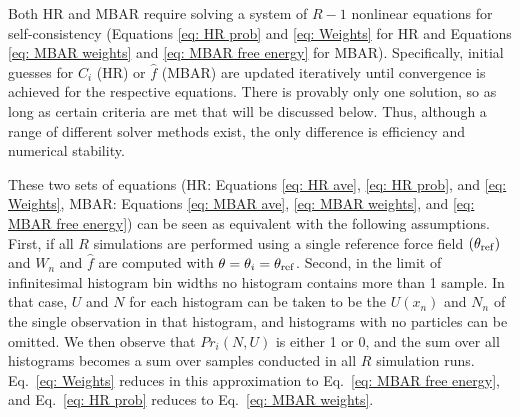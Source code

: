 \documentclass[journal=jced,manuscript=article]{achemso}
\newcommand{\bfv}[1]{{\mbox{\boldmath{$#1$}}}}
\newcommand{\x}{\bfv{x}}
\begin{document}


Both HR and MBAR require solving a system of $R-1$ nonlinear equations for self-consistency (Equations \ref{eq: HR prob} and \ref{eq: Weights} for HR and Equations \ref{eq: MBAR weights} and \ref{eq: MBAR free energy} for MBAR). Specifically, initial guesses for $C_i$ (HR) or $\hat f$ (MBAR) are updated iteratively until convergence is achieved for the respective equations. There is provably only one solution, so as long as certain criteria are met that will be discussed below. Thus, although a range of different solver methods exist, the only difference is efficiency and numerical stability.


These two sets of equations (HR: Equations \ref{eq: HR ave}, \ref{eq: HR prob}, and \ref{eq: Weights}, MBAR: Equations \ref{eq: MBAR ave}, \ref{eq: MBAR weights}, and \ref{eq: MBAR free energy}) can be seen as equivalent with the following assumptions. First, if all $R$ simulations are performed using a single reference force field $(\theta_{\rm ref})$ and $W_{n}$ and $\hat f$ are computed with $\theta = \theta_i = \theta_{\rm ref}$. Second, in the limit of infinitesimal histogram bin widths no histogram contains more than 1 sample. In that case, $U$ and $N$ for each histogram can be taken to be the $U(x_n)$ and $N_n$ of the single observation in that histogram, and histograms with no particles can be omitted. We then observe that $Pr_i(N,U)$ is either 1 or 0, and the sum over all histograms becomes a sum over samples conducted in all $R$ simulation runs. Eq.~\ref{eq: Weights} reduces in this approximation to Eq.~\ref{eq: MBAR free energy}, and Eq.~\ref{eq: HR prob} reduces to Eq.~\ref{eq: MBAR weights}.
\end{document}

